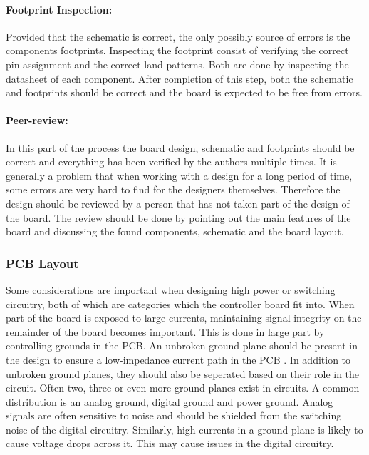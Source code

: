 \paragraph{Footprint Inspection:}
Provided that the schematic is correct, the only possibly source of errors is the components footprints. 
Inspecting the footprint consist of verifying the correct pin assignment and the correct land patterns.
Both are done by inspecting the datasheet of each component. 
After completion of this step, both the schematic and footprints should be correct and the board is expected to be free from errors.

\paragraph{Peer-review:}
In this part of the process the board design, schematic and footprints should be correct and everything has been verified by the authors multiple times.
It is generally a problem that when working with a design for a long period of time, some errors are very hard to find for the designers themselves. 
Therefore the design should be reviewed by a person that has not taken part of the design of the board.
The review should be done by pointing out the main features of the board and discussing the found components, schematic and the board layout.


\subsubsection{PCB Layout} %
Some considerations are important when designing high power or switching circuitry, both of which are categories which the controller board fit into.
When part of the board is exposed to large currents, maintaining signal integrity on the remainder of the board becomes important.
This is done in large part by controlling grounds in the PCB.
An unbroken ground plane should be present in the design to ensure a low-impedance current path in the PCB \cite{pcblayoutds}.
In addition to unbroken ground planes, they should also be seperated based on their role in the circuit.
Often two, three or even more ground planes exist in circuits.
A common distribution is an analog ground, digital ground and power ground.
Analog signals are often sensitive to noise and should be shielded from the switching noise of the digital circuitry.
Similarly, high currents in a ground plane is likely to cause voltage drops across it.
This may cause issues in the digital circuitry.

